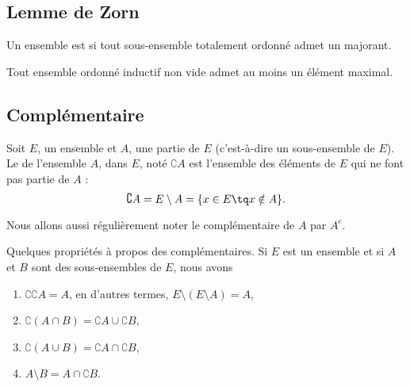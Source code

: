 \subsection{Lemme de Zorn}

\begin{definition}  \label{DefGHDfyyz}
    Un ensemble est  si tout sous-ensemble totalement ordonné admet un majorant.
\end{definition}


\begin{lemma}    \label{LemUEGjJBc}
    Tout ensemble ordonné inductif non vide admet au moins un élément maximal.
\end{lemma}

\subsection{Complémentaire}
\label{AppComplement}

\begin{definition}
    Soit $E$, un ensemble et $A$, une partie de $E$ (c'est-à-dire un sous-ensemble de $E$). Le  de l'ensemble $A$, dans $E$, noté $\complement A$ est l'ensemble des éléments de $E$ qui ne font pas partie de $A$ :
    \begin{equation}
	    \complement A=E\setminus A=\{ x\in E\tq x\notin A \}.
    \end{equation}
\end{definition}

Nous allons aussi régulièrement noter le complémentaire de \( A\) par \( A^c\).

\begin{lemma}		\label{LemPropsComplement}
	Quelques propriétés à propos des complémentaires. Si $E$ est un ensemble et si $A$ et $B$ sont des sous-ensembles de $E$, nous avons
	\begin{enumerate}
		\item
			$\complement \complement A =A $, en d'autres termes, $E\setminus(E\setminus A)=A$,
		\item
			$\complement(A\cap B)=\complement A\cup\complement B$,
		\item
			$\complement(A\cup B)=\complement A\cap\complement B$,
		\item	\label{ItemLemPropComplementiii}
			$A\setminus B=A\cap\complement B$.
	\end{enumerate}
\end{lemma}


